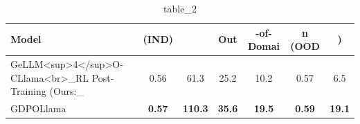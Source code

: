 \begin{table}[t]
\centering
\caption{table\_2}
\label{tab:2604.23061}
\begin{tabular}{lcccccc}
\toprule
Model & (IND) &  & Out & -of-Domai & n (OOD & ) \\
\midrule
GeLLM<sup>4</sup>O-CLlama<br>\_RL Post-Training (Ours:\_ & 0.56 & 61.3 & 25.2 & 10.2 & 0.57 & 6.5 \\
GDPOLlama & \textbf{0.57} & \textbf{110.3} & \textbf{35.6} & \textbf{19.5} & \textbf{0.59} & \textbf{19.1} \\
\bottomrule
\end{tabular}
\end{table}
